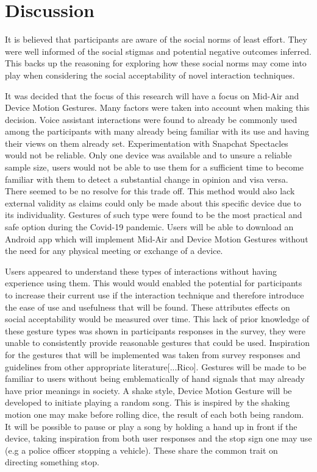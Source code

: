 \documentclass{l4proj}
\begin{document}
\section{Discussion}

It is believed that participants are  aware of the social norms of least effort. They were well informed of the social stigmas and potential negative outcomes inferred. This backs up the reasoning for exploring how these social norms may come into play when considering the social acceptability of novel interaction techniques.

It was decided that the focus of this research will have a focus on Mid-Air and Device Motion Gestures. Many factors were taken into account when making this decision. Voice assistant interactions were found to already be commonly used among the participants with many already being familiar with its use and having their views on them already set. Experimentation with  Snapchat Spectacles would not be reliable. Only one device was available and to unsure a reliable sample size, users would not be able to use them for a sufficient time to become familiar with them to detect a substantial change in opinion and visa versa. There seemed to be no resolve for this trade off. This method would also lack external validity as claims could only be made about this specific device due to its individuality. Gestures of such type were found to be the most practical and safe option during the Covid-19 pandemic. Users will be able to download an Android app which will implement Mid-Air and Device Motion Gestures without the need for any physical meeting or exchange of a device. 

Users appeared to understand these types of interactions without having experience using them. This would would enabled the potential for participants to increase their current use if the interaction technique and therefore introduce the ease of use and usefulness that will be found. These attributes effects on social acceptability would be measured over time. This lack of prior knowledge of these gesture types was shown in participants responses in the survey, they were unable to consistently provide reasonable gestures that could be used. Inspiration for the gestures that will be implemented was taken from survey responses and guidelines from other appropriate literature[...Rico]. Gestures will be made to be familiar to users without being emblematically of hand signals that may already have prior meanings in society. A shake style, Device Motion Gesture will be developed to initiate playing a random song. This is inspired by the shaking motion one may make before rolling dice, the result of each both being random. It will be possible to pause or play a song by holding a hand up in front if the device, taking inspiration from both user responses and the stop sign one may use (e.g a police officer stopping a vehicle). These share the common trait on directing something stop.
\end{document}
